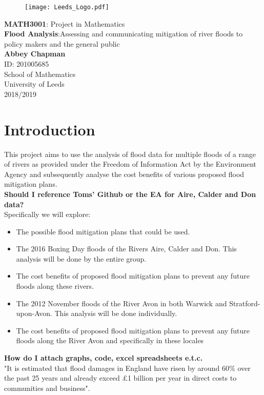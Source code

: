 \documentclass[11 pt, a4paper]{article}
\begin{document}
\begin{titlepage}
\begin{center}

\begin{figure}[h!]
\centering
\texttt{[image: Leeds\_Logo.pdf]}
\end{figure}

\vspace{4cm}
{\LARGE \textbf{MATH3001}: Project in Mathematics}\\

\vspace{1cm}
{\Huge \textbf{Flood Analysis}:Assessing and communicating mitigation of river floods to policy makers and the general public}\\
\vspace{5cm}
\textbf{Abbey Chapman}\\
ID: 201005685\\
\vfill
School of Mathematics\\
University of Leeds\\
2018/2019
\end{center}
\end{titlepage}

\tableofcontents 
\noindent \hrulefill

\newpage
\section{Introduction}
This project aims to use the analysis of flood data for multiple floods of a range of rivers as provided under the Freedom of Information Act by the Environment Agency and subsequently analyse the cost benefits of various proposed flood mitigation plans. \\
\textbf{Should I reference Toms' Github or the EA for Aire, Calder and Don data?}\\
Specifically we will explore:\\

\begin{framed}
\begin{itemize}
\item The possible flood mitigation plans that could be used.
\item The 2016 Boxing Day floods of the Rivers Aire, Calder and Don. This analysis will be done by the entire group.
\item The cost benefits of proposed flood mitigation plans to prevent any future floods along these rivers.
\item The 2012 November floods of the River Avon in both Warwick and Stratford-upon-Avon. This analysis will be done individually.
\item The cost benefits of proposed flood mitigation plans to prevent any future floods along the River Avon and specifically in these locales
\end{itemize}
\end{framed}
\textbf{How do I attach graphs, code, excel spreadsheets e.t.c.}\\
"It is estimated that flood damages in England have risen by around 60\% over the past 25 years and already exceed £1 billion per year in direct costs to communities and business".\cite{2}
\end{document}
